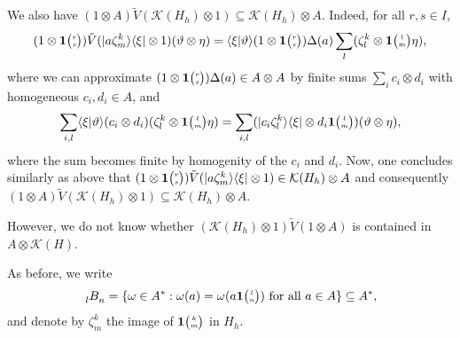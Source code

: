 \begin{Rem}
  We also have $(1 \otimes A)\tilde V(\mathcal{K}(H_{h})\otimes 1)
  \subseteq \mathcal{K}(H_{h}) \otimes A$. Indeed, for all $r,s\in I$,
   \begin{align*}
     (1 \otimes \mathbf{1}{\tiny {\begin{pmatrix} r\\s\end{pmatrix}}})\tilde
     V(|a\zeta^{k}_{m}\rangle\langle\xi|\otimes 1)(\vartheta \otimes
     \eta) = \langle \xi|\vartheta \rangle(1 \otimes
     \mathbf{1}{\tiny {\begin{pmatrix} r\\s\end{pmatrix}}})\Delta(a) \sum_{l} (\zeta^{k}_{l} \otimes
     \mathbf{1}{\tiny {\begin{pmatrix} l\\m\end{pmatrix}}}\eta),
   \end{align*}
where we can approximate $(1
   \otimes \mathbf{1}{\tiny {\begin{pmatrix} r\\s\end{pmatrix}}})\Delta(a) \in A\otimes A$ by finite sums
   $\sum_{i} c_{i} \otimes d_{i}$ with homogeneous $c_{i},d_{i} \in
   A$, and
   \begin{align*}
     \sum_{i,l} \langle \xi|\vartheta\rangle (c_{i} \otimes d_{i})(\zeta^{k}_{l} \otimes
     \mathbf{1}{\tiny {\begin{pmatrix} l\\m\end{pmatrix}}} \eta) = \sum_{i,l} (|c_{i}\zeta^{k}_{l}\rangle\langle \xi| \otimes
     d_{i}\mathbf{1}{\tiny {\begin{pmatrix} l\\m\end{pmatrix}}}) (\vartheta \otimes \eta),
   \end{align*}
   where the sum becomes finite by homogenity of the $c_{i}$ and $d_{i}$. Now, one concludes   similarly as above that $(1 \otimes \mathbf{1}{\tiny {\begin{pmatrix} r\\s\end{pmatrix}}})\tilde
   V(|a\zeta^{k}_{m}\rangle\langle\xi|\otimes 1) \in \mathcal{K}(H_{h}) \otimes A$ and consequently
   $(1\otimes A)\tilde V(\mathcal{K}(H_{h}) \otimes 1) \subseteq \mathcal{K}(H_{h}) \otimes A$.
  
However,   we do not know whether $(\mathcal{K}(H_{h}) \otimes 1)
   \tilde V(1\otimes A)$ is contained in $A\otimes \mathcal{K}(H)$.
\end{Rem}

As before, we write
\begin{align*}
  \Grd{B}{l}{n}  =\{ \omega \in A^{*} : \omega(a)=\omega(a\UnitC{l}{n}) \text{ for all  }a\in A\} \subseteq A^{*},
\end{align*}
and denote by  $\zeta^{k}_{m}$  the  image of $\mathbf{1}{\tiny {\begin{pmatrix} k\\m\end{pmatrix}}}$ in $H_{h}$. 

